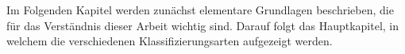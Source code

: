 Im Folgenden Kapitel werden zunächst elementare Grundlagen beschrieben, die für das Verständnis dieser Arbeit wichtig sind.
Darauf folgt das Hauptkapitel, in welchem die verschiedenen Klassifizierungsarten aufgezeigt werden.